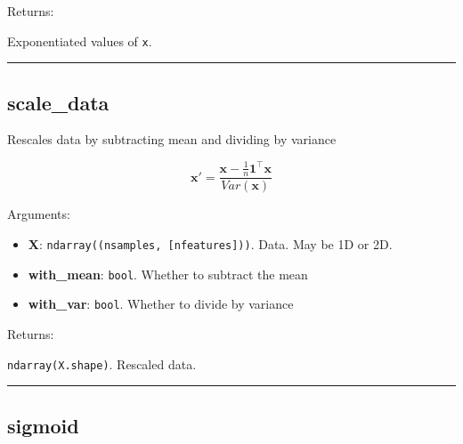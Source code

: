 Returns:

Exponentiated values of \texttt{x}.

\begin{center}\rule{0.5\linewidth}{\linethickness}\end{center}

\subsection{scale\_data}\label{scale_data}

\begin{Shaded}
\begin{Highlighting}[]
\OperatorTok{=}\OperatorTok{=}\OperatorTok{=}\NormalTok{)}
\end{Highlighting}
\end{Shaded}

Rescales data by subtracting mean and dividing by variance

\[
\mathbf x' = \frac{\mathbf x - \frac{1}{n} \mathbf 1^\top \mathbf x}{Var(\mathbf x)}
\]

Arguments:

\begin{itemize}
\tightlist
\item
  \textbf{X}: \texttt{ndarray((nsamples,\ {[}nfeatures{]}))}. Data. May
  be 1D or 2D.
\item
  \textbf{with\_mean}: \texttt{bool}. Whether to subtract the mean
\item
  \textbf{with\_var}: \texttt{bool}. Whether to divide by variance
\end{itemize}

Returns:

\texttt{ndarray(X.shape)}. Rescaled data.

\begin{center}\rule{0.5\linewidth}{\linethickness}\end{center}

\subsection{sigmoid}\label{sigmoid}

\begin{Shaded}
\begin{Highlighting}[]
\OperatorTok{=-}\OperatorTok{=}\NormalTok{)}
\end{Highlighting}
\end{Shaded}

